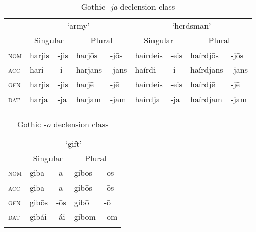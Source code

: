 \begin{table}[h]
    \centering
      \caption{Gothic \textit{-ja} declension class}\label{tab:ja-class-gothic}
  \begin{tabular}{lllllllll}
    \lsptoprule
    & \multicolumn{4}{c}{`army'} & \multicolumn{4}{c}{`herdsman'} \\
    & \multicolumn{2}{c}{Singular} & \multicolumn{2}{c}{Plural}   & \multicolumn{2}{c}{Singular} & \multicolumn{2}{c}{Plural} \\

    \midrule
    \textsc{nom} & harjis & -jis & harjōs  & -jōs  & haírdeis & -eis & haírdjōs  & -jōs  \\
    \textsc{acc} & hari   & -i   & harjans & -jans & haírdi   & -i   & haírdjans & -jans \\
    \textsc{gen} & harjis & -jis & harjē   & -jē   & haírdeis & -eis & haírdjē   & -jē   \\
    \textsc{dat} & harja  & -ja  & harjam  & -jam  & haírdja  & -ja  & haírdjam  & -jam  \\
    \lspbottomrule
  \end{tabular}
\end{table}

\begin{table}[h!]
    \centering
    \caption{Gothic \textit{-o} declension class}\label{tab:o-class-gothic}
    \begin{tabular}{lllll}
      \lsptoprule
      & \multicolumn{4}{c}{`gift'}                   \\
      & \multicolumn{2}{c}{Singular} & \multicolumn{2}{c}{Plural} \\
      \midrule
      \textsc{nom} & giba                         & -a  & gibōs & -ōs          \\
      \textsc{acc} & giba                         & -a  & gibōs & -ōs          \\
      \textsc{gen} & gibōs                        & -ōs & gibō  & -ō           \\
      \textsc{dat} & gibái                        & -ái & gibōm & -ōm          \\
      \lspbottomrule
    \end{tabular}
\end{table}

\clearpage 

